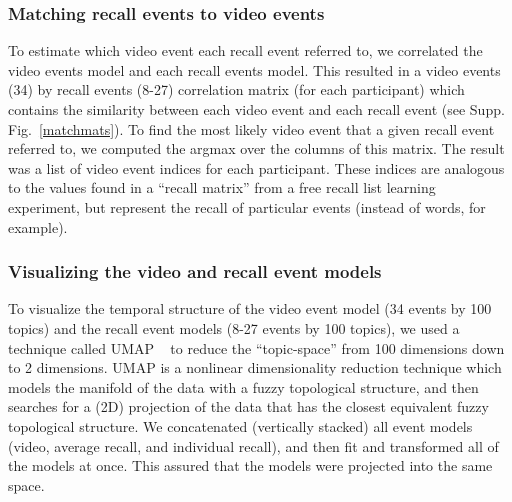 \documentclass{article}
\begin{document}
\subsubsection*{Matching recall events to video events}
To estimate which video event each recall event referred to, we correlated the video events model and each recall events model. This resulted in a video events (34) by recall events (8-27) correlation matrix (for each participant) which contains the similarity between each video event and each recall event (see Supp. Fig.~\ref{matchmats}).  To find the most likely video event that a given recall event referred to, we computed the argmax over the columns of this matrix.  The result was a list of video event indices for each participant. These indices are analogous to the values found in a ``recall matrix'' from a free recall list learning experiment, but represent the recall of particular events (instead of words, for example).

\subsubsection*{Visualizing the video and recall event models}
To visualize the temporal structure of the video event model (34 events by 100 topics) and the recall event models (8-27 events by 100 topics), we used a technique called UMAP ~\citep{McInHeal18} to reduce the ``topic-space'' from 100 dimensions down to 2 dimensions. UMAP is a nonlinear dimensionality reduction technique which models the manifold of the data with a fuzzy topological structure, and then searches for a (2D) projection of the data that has the closest equivalent fuzzy topological structure. We concatenated (vertically stacked) all event models (video, average recall, and individual recall), and then fit and transformed all of the models at once. This assured that the models were projected into the same space.
\end{document}
